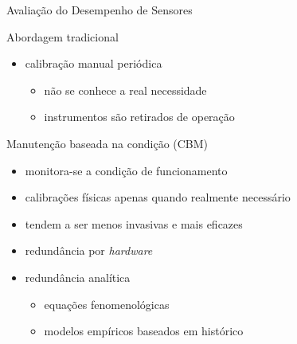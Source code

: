 \documentclass{beamer}
\begin{document}
\begin{frame}{Avaliação do Desempenho de Sensores}
    \begin{block}{Abordagem tradicional}
        \begin{itemize}
            \item calibração manual periódica
                \begin{itemize}
                    \item não se conhece a real necessidade
                    \item instrumentos são retirados de operação
                \end{itemize}
        \end{itemize}
    \end{block}

    \begin{block}{Manutenção baseada na condição (CBM)}
        \begin{itemize}
            \item monitora-se a \alert{condição} de funcionamento
            \item calibrações físicas apenas quando realmente \alert{necessário}
            \item tendem a ser menos invasivas e mais eficazes
                \vspace{6pt}
            \item redundância por \textit{hardware}
            \item redundância \alert{analítica}
                \begin{itemize}
                    \item equações fenomenológicas
                    \item modelos empíricos baseados em \alert{histórico}
                \end{itemize}
        \end{itemize}
        
    \end{block}

    
\end{frame}
\end{document}
